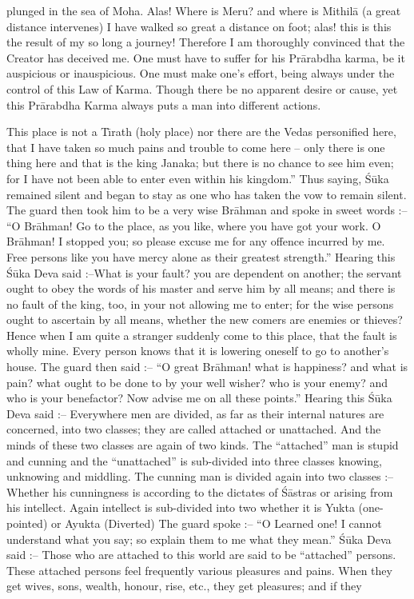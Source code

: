 plunged in the sea of Moha. Alas! Where is Meru? and where is Mithil\=a (a great distance intervenes) I have walked so great a distance on foot; alas! this is this the result of my so long a journey! Therefore I am thoroughly convinced that the Creator has deceived me. One must have to suffer for his Pr\=arabdha karma, be it auspicious or inauspicious. One must make one's effort, being always under the control of this Law of Karma. Though there be no apparent desire or cause, yet this Pr\=arabdha Karma always puts a man into different actions.

This place is not a T\={\i}rath (holy place) nor there are the Vedas personified here, that I have taken so much pains and trouble to come here -- only there is one thing here and that is the king Janaka; but there is no chance to see him even; for I have not been able to enter even within his kingdom.'' Thus saying, \'S\=uka remained silent and began to stay as one who has taken the vow to remain silent. The guard then took him to be a very wise Br\=ahman and spoke in sweet words :-- ``O Br\=ahman! Go to the place, as you like, where you have got your work. O Br\=ahman! I stopped you; so please excuse me for any offence incurred by me. Free persons like you have mercy alone as their greatest strength.'' Hearing this \'S\=uka Deva said :--What is your fault? you are dependent on another; the servant ought to obey the words of his master and serve him by all means; and there is no fault of the king, too, in your not allowing me to enter; for the wise persons ought to ascertain by all means, whether the new comers are enemies or thieves? Hence when I am quite a stranger suddenly come to this place, that the fault is wholly mine. Every person knows that it is lowering oneself to go to another's house. The guard then said :-- ``O great Br\=ahman! what is happiness? and what is pain? what ought to be done to by your well wisher? who is your enemy? and who is your benefactor? Now advise me on all these points.'' Hearing this \'S\=uka Deva said :-- Everywhere men are divided, as far as their internal natures are concerned, into two classes; they are called attached or unattached. And the minds of these two classes are again of two kinds. The ``attached'' man is stupid and cunning and the ``unattached'' is sub-divided into three classes knowing, unknowing and middling. The cunning man is divided again into two classes :-- Whether his cunningness is according to the dictates of \'S\=astras or arising from his intellect. Again intellect is sub-divided into two whether it is Yukta (one-pointed) or Ayukta (Diverted) The guard spoke :-- ``O Learned one! I cannot understand what you say; so explain them to me what they mean.'' \'S\=uka Deva said :-- Those who are attached to this world are said to be ``attached'' persons. These attached persons feel frequently various pleasures and pains. When they get wives, sons, wealth, honour, rise, etc., they get pleasures; and if they

